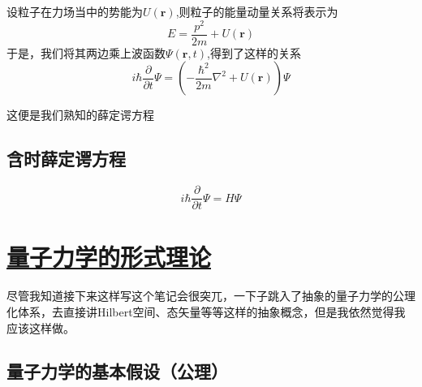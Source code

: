 \documentclass{article}
\newcommand{\Da}[2]{\frac{\partial}{\partial#2}#1}
\begin{document}
设粒子在力场当中的势能为$U(\textbf{r})$,则粒子的能量动量关系将表示为
\[
	E=\frac{p^2}{2m}+U(\textbf{r})
\]
于是，我们将其两边乘上波函数$\Psi(\textbf{r},t)$,得到了这样的关系
\begin{equation}
	i\hbar\Da{\Psi}{t}=(-\frac{\hbar^2}{2m}\nabla^2+U(\textbf{r}))\Psi
\end{equation}

这便是我们熟知的薛定谔方程

\subsection{含时薛定谔方程}
\begin{equation}
	i\hbar\Da{\Psi}{t}=H\Psi
\end{equation}




\section{\protect\hyperlink{:}{量子力学的形式理论}}
尽管我知道接下来这样写这个笔记会很突兀，一下子跳入了抽象的量子力学的公理化体系，去直接讲Hilbert空间、态矢量等等这样的抽象概念，但是我依然觉得我应该这样做。

\subsection{量子力学的基本假设（公理）}
\end{document}
